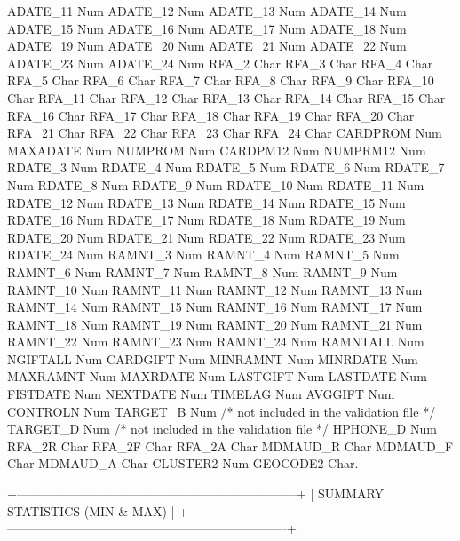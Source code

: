 \documentclass[
  11pt,
  a4paper,
  DIV=12,captions=tableheading,oneside,titlepage]{scrbook}
\let\oldverbatim\verbatim
\let\endoldverbatim\endverbatim
\renewenvironment{verbatim}{\footnotesize\oldverbatim}{\endoldverbatim}
\begin{document}
\begin{verbatim}
  ADATE_11    Num   
  ADATE_12    Num   
  ADATE_13    Num   
  ADATE_14    Num   
  ADATE_15    Num   
  ADATE_16    Num   
  ADATE_17    Num   
  ADATE_18    Num   
  ADATE_19    Num   
  ADATE_20    Num   
  ADATE_21    Num   
  ADATE_22    Num   
  ADATE_23    Num   
  ADATE_24    Num   
  RFA_2       Char  
  RFA_3       Char  
  RFA_4       Char  
  RFA_5       Char  
  RFA_6       Char  
  RFA_7       Char  
  RFA_8       Char  
  RFA_9       Char  
  RFA_10      Char  
  RFA_11      Char  
  RFA_12      Char  
  RFA_13      Char  
  RFA_14      Char  
  RFA_15      Char  
  RFA_16      Char  
  RFA_17      Char  
  RFA_18      Char  
  RFA_19      Char  
  RFA_20      Char  
  RFA_21      Char  
  RFA_22      Char  
  RFA_23      Char  
  RFA_24      Char  
  CARDPROM    Num   
  MAXADATE    Num   
  NUMPROM     Num   
  CARDPM12    Num   
  NUMPRM12    Num   
  RDATE_3     Num   
  RDATE_4     Num   
  RDATE_5     Num   
  RDATE_6     Num   
  RDATE_7     Num   
  RDATE_8     Num   
  RDATE_9     Num   
  RDATE_10    Num   
  RDATE_11    Num   
  RDATE_12    Num   
  RDATE_13    Num   
  RDATE_14    Num   
  RDATE_15    Num   
  RDATE_16    Num   
  RDATE_17    Num   
  RDATE_18    Num   
  RDATE_19    Num   
  RDATE_20    Num   
  RDATE_21    Num   
  RDATE_22    Num   
  RDATE_23    Num   
  RDATE_24    Num   
  RAMNT_3     Num   
  RAMNT_4     Num   
  RAMNT_5     Num   
  RAMNT_6     Num   
  RAMNT_7     Num   
  RAMNT_8     Num   
  RAMNT_9     Num   
  RAMNT_10    Num   
  RAMNT_11    Num   
  RAMNT_12    Num   
  RAMNT_13    Num   
  RAMNT_14    Num   
  RAMNT_15    Num   
  RAMNT_16    Num   
  RAMNT_17    Num   
  RAMNT_18    Num   
  RAMNT_19    Num   
  RAMNT_20    Num   
  RAMNT_21    Num   
  RAMNT_22    Num   
  RAMNT_23    Num   
  RAMNT_24    Num   
  RAMNTALL    Num   
  NGIFTALL    Num   
  CARDGIFT    Num   
  MINRAMNT    Num   
  MINRDATE    Num   
  MAXRAMNT    Num   
  MAXRDATE    Num   
  LASTGIFT    Num   
  LASTDATE    Num   
  FISTDATE    Num   
  NEXTDATE    Num   
  TIMELAG     Num   
  AVGGIFT     Num   
  CONTROLN    Num   
  TARGET_B    Num   /* not included in the validation file */
  TARGET_D    Num   /* not included in the validation file */ 
  HPHONE_D    Num   
  RFA_2R      Char  
  RFA_2F      Char  
  RFA_2A      Char  
  MDMAUD_R    Char  
  MDMAUD_F    Char  
  MDMAUD_A    Char  
  CLUSTER2    Num   
  GEOCODE2    Char.  


+--------------------------------------------------------------------+
| SUMMARY STATISTICS (MIN & MAX)                                     | 
+--------------------------------------------------------------------+


\end{verbatim}
\end{document}
